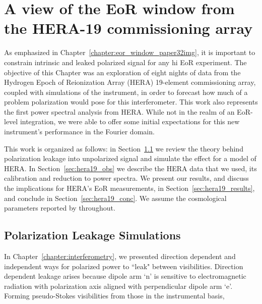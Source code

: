 \chapter{A view of the EoR window from the HERA-19 commissioning array}
\label{chapter:eor_window_HERA}

As emphasized in Chapter~\ref{chapter:eor_window_paper32img}, it is important to constrain intrinsic and leaked polarized signal for any {\sc hi} EoR experiment. 
The objective of this Chapter was an exploration of eight nights of data from the Hydrogen Epoch of Reionization Array (HERA) 19-element commissioning array, coupled with simulations of the instrument, in order to forecast how much of a problem polarization would pose for this interferometer. 
This work also represents the first power spectral analysis from HERA. While not in the realm of an EoR-level integration, we were able to offer some initial expectations for this new instrument's performance in the Fourier domain.

This work is organized as follows: in Section~\ref{sec:hera19_leak} we review the theory behind polarization leakage into unpolarized signal and simulate the effect for a model of HERA. In Section~\ref{sec:hera19_obs} we describe the HERA data that we used, its calibration and reduction to power spectra. We present our results, and discuss the implications for HERA's EoR measurements, in Section~\ref{sec:hera19_results}, and conclude in Section~\ref{sec:hera19_conc}. We assume the cosmological parameters reported by \cite{Planck.16} throughout.

\section{Polarization Leakage Simulations}
\label{sec:hera19_leak}

In Chapter~\ref{chapter:interferometry}, we presented direction dependent and independent ways for polarized power to ``leak" between visibilities. Direction dependent leakage arises because dipole arm `n' is sensitive to electromagnetic radiation with polarization axis aligned with perpendicular dipole arm `e'. Forming pseudo-Stokes visibilities from those in the instrumental basis,

